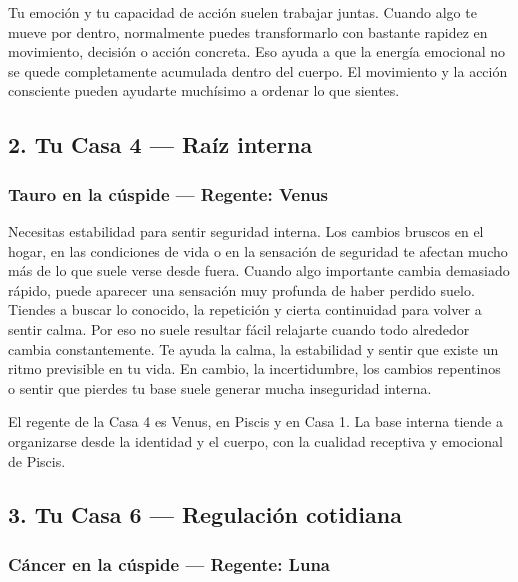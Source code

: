 \documentclass[11pt,a4paper]{article}
\begin{document}
Tu emoción y tu capacidad de acción suelen trabajar juntas. Cuando algo te mueve por dentro, normalmente puedes transformarlo con bastante rapidez en movimiento, decisión o acción concreta. Eso ayuda a que la energía emocional no se quede completamente acumulada dentro del cuerpo. El movimiento y la acción consciente pueden ayudarte muchísimo a ordenar lo que sientes.

\vspace{0.8cm}

\subsection{2. Tu Casa 4 — Raíz interna}

\subsubsection*{Tauro en la cúspide — Regente: Venus}

Necesitas estabilidad para sentir seguridad interna. Los cambios bruscos en el hogar, en las condiciones de vida o en la sensación de seguridad te afectan mucho más de lo que suele verse desde fuera. Cuando algo importante cambia demasiado rápido, puede aparecer una sensación muy profunda de haber perdido suelo. Tiendes a buscar lo conocido, la repetición y cierta continuidad para volver a sentir calma. Por eso no suele resultar fácil relajarte cuando todo alrededor cambia constantemente. Te ayuda la calma, la estabilidad y sentir que existe un ritmo previsible en tu vida. En cambio, la incertidumbre, los cambios repentinos o sentir que pierdes tu base suele generar mucha inseguridad interna.

El regente de la Casa 4 es Venus, en Piscis y en Casa 1. La base interna tiende a organizarse desde la identidad y el cuerpo, con la cualidad receptiva y emocional de Piscis.

\vspace{0.8cm}

\subsection{3. Tu Casa 6 — Regulación cotidiana}

\subsubsection*{Cáncer en la cúspide — Regente: Luna}
\end{document}

